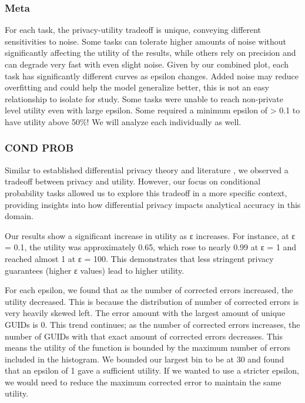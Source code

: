\documentclass[12pt,letterpaper]{article}
\begin{document}
\subsubsection{Meta}
For each task, the privacy-utility tradeoff is unique, conveying different sensitivities to noise. Some tasks can tolerate higher amounts of noise without significantly affecting the utility of the results, while others rely on precision and can degrade very fast with even slight noise. Given by our combined plot, each task has significantly different curves as epsilon changes. Added noise may reduce overfitting and could help the model generalize better, this is not an easy relationship to isolate for study. Some tasks were unable to reach non-private level utility even with large epsilon. Some required a minimum epsilon of > 0.1 to have utility above 50\%! We will analyze each individually as well.

\subsubsection{COND PROB}
Similar to established differential privacy theory and literature \cite{DworkRoth}, we observed a tradeoff between privacy and utility. However, our focus on conditional probability tasks allowed us to explore this tradeoff in a more specific context, providing insights into how differential privacy impacts analytical accuracy in this domain.

Our results show a significant increase in utility as ε increases. For instance, at ε = 0.1, the utility was approximately 0.65, which rose to nearly 0.99 at ε = 1 and reached almost 1 at ε = 100. This demonstrates that less stringent privacy guarantees (higher ε values) lead to higher utility.

For each epsilon, we found that as the number of corrected errors increased, the utility decreased. This is because the distribution of number of corrected errors is very heavily skewed left. The error amount with the largest amount of unique GUIDs is 0. This trend continues; as the number of corrected errors increases, the number of GUIDs with that exact amount of corrected errors decreases. This means the utility of the function is bounded by the maximum number of errors included in the histogram. We bounded our largest bin to be at 30 and found that an epsilon of 1 gave a sufficient utility. If we wanted to use a stricter epsilon, we would need to reduce the maximum corrected error to maintain the same utility. 
\end{document}

